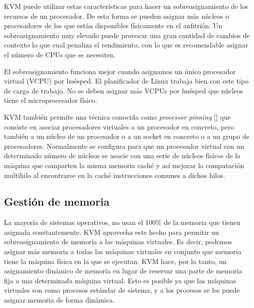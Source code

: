 \documentclass[spanisheDIVcalc,twoside,parskip-,pointlessnumbers,final]{scrbook}
\begin{document}
KVM puede utilizar estas características para hacer un sobreasignamiento
de los recursos de un procesador. De esta forma se pueden asignar
más núcleos o procesadores de los que están disponibles físicamente
en el anfitrión. Un sobreasignamiento muy elevado puede provocar una
gran cantidad de cambios de contexto lo que cual penaliza el rendimiento,
con lo que es recomendable asignar el número de CPUs que se necesiten.

El sobreasignamiento funciona mejor cuando asignamos un único procesador
virtual (VCPU) por huésped. El planificador de Linux trabaja bien
con este tipo de carga de trabajo. No se deben asignar más VCPUs por
huésped que núcleos tiene el microprocesador físico.

KVM también permite una técnica conocida como \emph{processor pinning
} [\cite{VirtOverview}] que consiste en asociar procesadores virtuales a un
procesador en concreto, pero también a un núcleo de un procesador
o a un socket en concreto o a un grupo de procesadores. Normalmente
se configura para que un procesador virtual con un determinado número
de núcleos se asocie con una serie de núcleos físicos de la máquina
que comparten la misma memoria caché y así mejorar la computación
multihilo al encontrarse en la caché instrucciones comunes a dichos
hilos.


\subsection{Gestión de memoria}

La mayoría de sistemas operativos, no usan el 100\% de la memoria
que tienen asignada constantemente. KVM aprovecha este hecho para
permitir un sobreasignamiento de memoria a las máquinas virtuales.
Es decir, podemos asignar más memoria a todas las máquinas virtuales
en conjunto que memoria tiene la máquina física en la que se ejecutan.
KVM hace, por lo tanto, un asignamiento dinámico de memoria en lugar
de reservar una parte de memoria fija a una determinada máquina virtual.
Esto es posible ya que las máquinas virtuales son como procesos estándar
de sistema, y a los procesos se les puede asignar memoria de forma
dinámica. 
\end{document}

